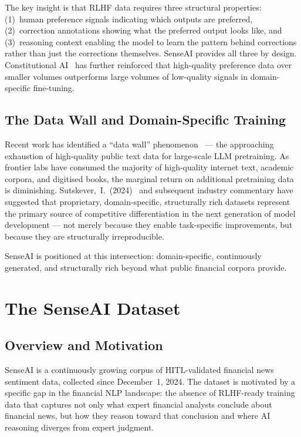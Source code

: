 \documentclass[11pt,a4paper]{article}
\begin{document}
The key insight is that RLHF data requires three structural properties: (1)~human
preference signals indicating which outputs are preferred, (2)~correction annotations
showing what the preferred output looks like, and (3)~reasoning context enabling the
model to learn the pattern behind corrections rather than just the corrections
themselves. SenseAI provides all three by design. Constitutional
AI~\cite{bai2022constitutional} has further reinforced that high-quality preference data
over smaller volumes outperforms large volumes of low-quality signals in
domain-specific fine-tuning.

\subsection{The Data Wall and Domain-Specific Training}

Recent work has identified a ``data wall'' phenomenon~\cite{villalobos2022will} --- the
approaching exhaustion of high-quality public text data for large-scale LLM
pretraining. As frontier labs have consumed the majority of high-quality internet text,
academic corpora, and digitised books, the marginal return on additional pretraining
data is diminishing. Sutskever,~I.\ (2024)~\cite{sutskever2024} and subsequent industry commentary have
suggested that proprietary, domain-specific, structurally rich datasets represent the
primary source of competitive differentiation in the next generation of model
development --- not merely because they enable task-specific improvements, but
because they are structurally irreproducible.

SenseAI is positioned at this intersection: domain-specific, continuously generated,
and structurally rich beyond what public financial corpora provide.

\section{The SenseAI Dataset}
\label{sec:dataset}

\subsection{Overview and Motivation}

SenseAI is a continuously growing corpus of HITL-validated financial news sentiment
data, collected since December~1, 2024. The dataset is motivated by a specific gap
in the financial NLP landscape: the absence of RLHF-ready training data that captures
not only what expert financial analysts conclude about financial news, but how they
reason toward that conclusion and where AI reasoning diverges from expert judgment.
\end{document}

